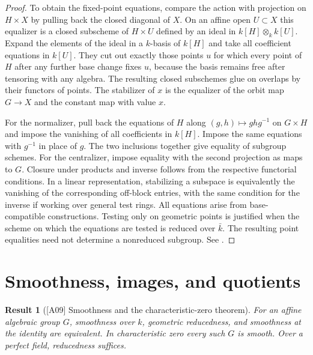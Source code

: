 \documentclass[11pt,a4paper,openany,oneside]{book}
\theoremstyle{resultstyle}
\newtheorem{statement}{Result}[chapter]
\newenvironment{result}[2]{\clubpenalty=10000\begin{statement}[\textnormal{[#1]} #2]\leavevmode\label{res:#1}\ignorespaces}{\end{statement}}
\theoremstyle{definition}
\numberwithin{equation}{chapter}
\begin{document}
\begin{proof}
To obtain the fixed-point equations, compare the action with projection
on \(H\times X\) by pulling back the closed diagonal of \(X\). On an
affine open \(U\subset X\) this equalizer is a closed subscheme of
\(H\times U\) defined by an ideal in \(k[H]\otimes_k k[U]\).
Expand the elements of the ideal in a \(k\)-basis of \(k[H]\) and
take all coefficient equations in \(k[U]\). They cut out exactly those
points \(u\) for which every point of \(H\) after any further base change
fixes \(u\), because the basis remains free after tensoring with any
algebra. The resulting closed subschemes glue on overlaps by their
functors of points. The stabilizer of \(x\) is the equalizer of the
orbit map \(G\to X\) and the constant map with value \(x\).

For the normalizer, pull back the equations of \(H\) along
\((g,h)\mapsto ghg^{-1}\) on \(G\times H\) and impose the vanishing of
all coefficients in \(k[H]\). Impose the same equations with \(g^{-1}\)
in place of \(g\). The two inclusions together give equality of
subgroup schemes. For the centralizer, impose equality
with the second projection as maps to \(G\). Closure under products
and inverse follows from the respective functorial conditions. In a
linear representation, stabilizing a subspace is equivalently the
vanishing of the corresponding off-block entries, with the same
condition for the inverse if working over general test rings.
All equations arise from base-compatible constructions. Testing only
on geometric points is justified when the scheme on which the
equations are tested is reduced over \(\bar k\). The resulting point
equalities need not determine a nonreduced subgroup.
See \cite[Propositions 1.79, 1.83--1.84, 1.92--1.93 and Theorem 1.105]{milne}.
\end{proof}

\section{Smoothness, images, and quotients}

\begin{result}{A09}{Smoothness and the characteristic-zero theorem}
For an affine algebraic group \(G\), smoothness over \(k\), geometric
reducedness, and smoothness at the identity are equivalent. In
characteristic zero every such \(G\) is smooth. Over a perfect field,
reducedness suffices.
\end{result}
\end{document}
